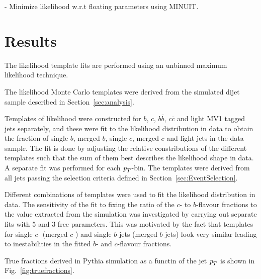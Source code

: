 - Minimize likelihood w.r.t floating parameters using {\sc MINUIT}. %




\section{Results}\label{sec:FitsResults}

The likelihood template fits are performed using an unbinned maximum likelihood technique.

The likelihood Monte Carlo templates were derived from the simulated dijet sample described in Section~\ref{sec:analysis}.

Templates of likelihood were constructed for $b$, $c$, $b\bar{b}$, $c\bar{c}$ and light MV1 tagged jets separately, and these were fit to the likelihood distribution in data to obtain the fraction of single $b$, merged $b$, single $c$, merged $c$ and light jets in the data sample.  The fit is done by adjusting the relative constributions of the different templates such that the sum of them best describes the likelihood shape in data. A separate fit was performed for each ${\emph{p}_{T}}$-bin.  The templates were derived from all jets passing the selection criteria defined in Section~\ref{sec:EventSelection}.


Different combinations of templates were used to fit the likelihood distribution in data. 
The sensitivity of the fit to fixing the ratio of the $c$- to $b$-flavour fractions to the value extracted from the simulation was investigated by carrying out separate fits with 5 and 3 free parameters. This was motivated by the fact that templates for single $c$- (merged $c$-)  and single $b$-jets (merged $b$-jets) look very similar leading to inestabilities in the fitted $b$- and $c$-flavour fractions.




True fractions derived in {\sc Pythia} simulation as a functin of the jet ${\emph{p}_{T}}$ is shown in Fig.~\ref{fig:truefractions}.


